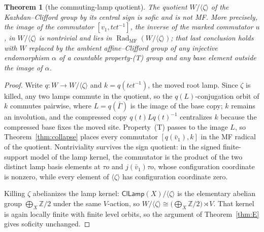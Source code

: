 \documentclass[11pt]{amsart}
\newcommand{\leanverified}[2]{\ignorespaces}
\newtheorem{theorem}{Theorem}[section]
\theoremstyle{definition}
\theoremstyle{remark}
\theoremstyle{plain}
\newcommand{\Z}{\mathbb Z}
\newcommand{\ClLamp}{\mathsf{ClLamp}}
\begin{document}
\begin{theorem}[the commuting-lamp quotient]\label{thm:commutinglamp}
The quotient $W/\langle\zeta\rangle$ of the Kazhdan--Clifford group
by its central sign is sofic and is not MF\@.  More precisely, the
image of the
commutator $[v_1,tct^{-1}]$, the inverse of the marked commutator
$u$, in $W/\langle\zeta\rangle$ is nontrivial and lies in
$\operatorname{Rad}_{\mathrm{MF}}(W/\langle\zeta\rangle)$; that last
conclusion holds with $W$ replaced by the ambient affine--Clifford group of
any injective endomorphism $\alpha$ of a countable
property-\textup{(T)} group and any base element outside the image of
$\alpha$.
\leanverified{Sofic/CommutingLampQuotientSofic}{GroupApproximation.CommutingLampQuotientSofic.literalSignFreeQuotient_isSofic_and_not_isCDEOperatorMF}
\leanverified{Sofic/CommutingLampCollapse}{GroupApproximation.CommutingLampCollapse.commutingLampQuotient_collapse}
\leanverified{Sofic/CommutingLampCollapse}{GroupApproximation.CommutingLampCollapse.literalCommutingLampQuotient_collapse}
\leanverified{Sofic/CommutingLampCollapse}{GroupApproximation.CommutingLampCollapse.literalCommutingLampQuotient_not_isCDEOperatorMF}
\end{theorem}

\begin{proof}
Write $q\colon W\to W/\langle\zeta\rangle$ and
$k=q(tct^{-1})$, the moved root lamp.  Since $\zeta$ is killed, any
two lamps commute in the quotient, so the $q(L)$-conjugation orbit of
$k$ commutes pairwise, where $L=q(\bar\Gamma)$ is the image of the
base copy; $k$ remains an involution, and the compressed copy
$q(t)Lq(t)^{-1}$ centralizes $k$ because the compressed base fixes the
moved site.  Property~\textup{(T)} passes to the image $L$, so
Theorem~\ref{thm:collapse} places every commutator
$[q(\bar v_1),k]$ in the MF radical of the quotient.  Nontriviality survives
the sign quotient: in the signed finite-support model of the lamp
kernel, the commutator is the product of the two distinct lamp basis
elements at $\tau o$ and $j(\bar v_1)\tau o$, whose configuration
coordinate is nonzero, while every element of
$\langle\zeta\rangle$ has configuration coordinate zero.

Killing $\zeta$ abelianizes the lamp kernel:
$\ClLamp(X)/\langle\zeta\rangle$ is the elementary abelian group
$\bigoplus_X\Z/2$ under the same $V$-action, so
$W/\langle\zeta\rangle\cong\bigl(\bigoplus_X\Z/2\bigr)\rtimes V$.
That kernel is again locally finite with finite level orbits, so the
argument of Theorem~\ref{thm:E} gives soficity unchanged.
\end{proof}
\end{document}
